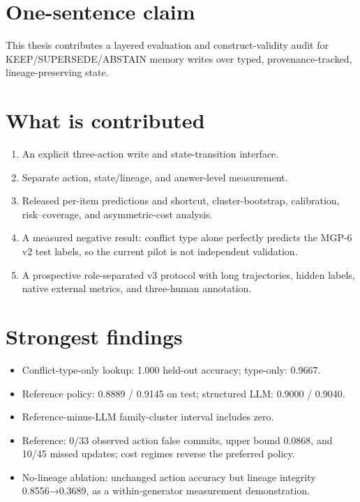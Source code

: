 \section{One-sentence claim}\label{one-sentence-claim}

This thesis contributes a layered evaluation and construct-validity
audit for KEEP/SUPERSEDE/ABSTAIN memory writes over typed,
provenance-tracked, lineage-preserving state.

\section{What is contributed}\label{what-is-contributed}

\begin{enumerate}
\def\labelenumi{\arabic{enumi}.}
\tightlist
\item
  An explicit three-action write and state-transition interface.
\item
  Separate action, state/lineage, and answer-level measurement.
\item
  Released per-item predictions and shortcut, cluster-bootstrap,
  calibration, risk--coverage, and asymmetric-cost analysis.
\item
  A measured negative result: conflict type alone perfectly predicts the
  MGP-6 v2 test labels, so the current pilot is not independent
  validation.
\item
  A prospective role-separated v3 protocol with long trajectories,
  hidden labels, native external metrics, and three-human annotation.
\end{enumerate}

\section{Strongest findings}\label{strongest-findings}

\begin{itemize}
\tightlist
\item
  Conflict-type-only lookup: 1.000 held-out accuracy; type-only: 0.9667.
\item
  Reference policy: 0.8889 / 0.9145 on test; structured LLM: 0.9000 /
  0.9040.
\item
  Reference-minus-LLM family-cluster interval includes zero.
\item
  Reference: 0/33 observed action false commits, upper bound 0.0868, and
  10/45 missed updates; cost regimes reverse the preferred policy.
\item
  No-lineage ablation: unchanged action accuracy but lineage integrity
  0.8556→0.3689, as a within-generator measurement demonstration.
\end{itemize}

